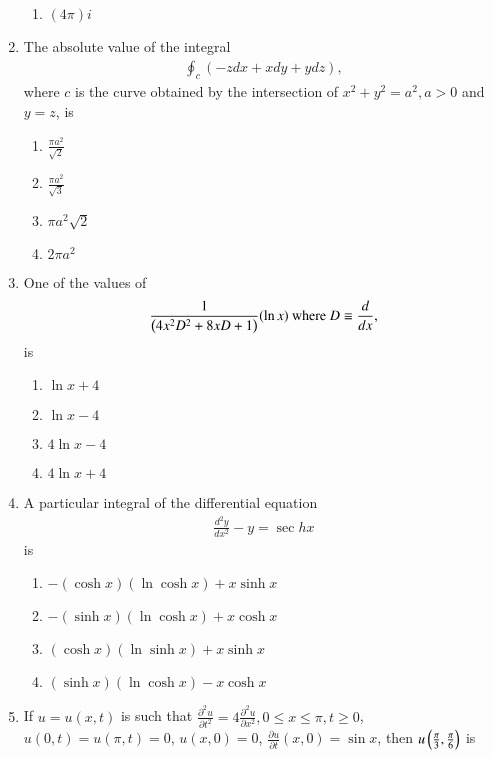 \documentclass[journal]{IEEEtran}
\begin{document}
\begin{enumerate}
\begin{enumerate}
			\item $(4 \pi) i$
        	\end{enumerate}	
	\item The absolute value of the integral
           \begin{align*}
		\oint_{c}(-zdx+xdy+ydz),
             \end{align*}
             where $c$ is the curve obtained by the intersection of $x^{2}+y^{2}=a^{2}, a>0$ and $y=z$, is
		\begin{enumerate}
			\item $\frac{\pi a^{2}}{\sqrt{2}}$
			\item $\frac{\pi a^{2}}{\sqrt{3}}$
			\item $\pi a^{2} \sqrt{2}$
			\item $2 \pi a^{2}$
        	\end{enumerate}	
	\item One of the values of
           \begin{align*}
		\frac{1}{\left(4 x^{2} D^{2}+8 x D+1\right)}(\ln x) \text { where } D \equiv \frac{d}{d x},
             \end{align*} 
             is
		\begin{enumerate}
			\item $\ln x+4$
			\item $\ln x-4$
			\item $4 \ln x-4$
			\item $4 \ln x+4$
        	\end{enumerate}	
	\item A particular integral of the differential equation
             \begin{align*}
		\frac{d^{2} y}{d x^{2}}-y=\sec h x
             \end{align*}
	 is
		\begin{enumerate}
			\item $-(\cosh x)(\ln \cosh x)+x \sinh x$
			\item $-(\sinh x)(\ln \cosh x)+x \cosh x$
			\item $(\cosh x)(\ln \sinh x)+x \sinh x$
			\item $(\sinh x)(\ln \cosh x)-x \cosh x$
        	\end{enumerate}
	\item If $u=u(x, t)$ is such that
$\frac{\partial^{2} u}{\partial t^{2}}=4 \frac{\partial^{2} u}{\partial x^{2}}, 0 \leq x \leq \pi, t \geq 0$,
$u(0, t)=u(\pi, t)=0$,
$u(x, 0)=0$,
$\frac{\partial u}{\partial t}(x, 0)=\sin x$,
then $u\left(\frac{\pi}{3}, \frac{\pi}{6}\right)$ is

\end{enumerate}
\end{document}
